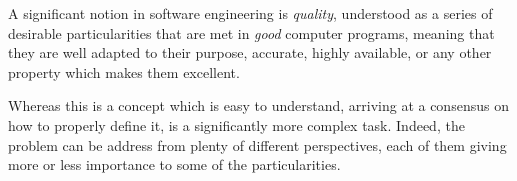 

A significant notion in software engineering is \textit{quality}, understood as a series of desirable particularities that are met in \textit{good} computer programs, meaning that they are well adapted to their purpose, accurate, highly available, or any other property which makes them excellent.

Whereas this is a concept which is easy to understand, arriving at a consensus on how to properly define it, is a significantly more complex task. Indeed, the problem can be address from plenty of different perspectives, each of them giving more or less importance to some of the particularities.

